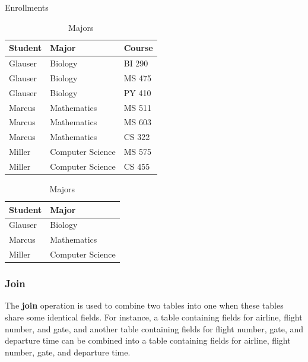 \documentclass[11pt]{article}
\begin{document}
\begin{table}[!htb]
    \begin{minipage}{.6\linewidth}
    \centering
    \caption{Enrollments}
    \begin{tabular}{|l|l|l|}
    \hline
        Student & Major & Course \\ \hline
        Glauser & Biology & BI 290 \\ \hline
        Glauser & Biology & MS 475 \\ \hline
        Glauser & Biology & PY 410 \\ \hline
        Marcus & Mathematics & MS 511 \\ \hline
        Marcus & Mathematics & MS 603 \\ \hline
        Marcus & Mathematics & CS 322 \\ \hline
        Miller & Computer Science & MS 575 \\ \hline
        Miller & Computer Science & CS 455 \\ \hline
    \end{tabular}
        
    \end{minipage}%
    \begin{minipage}{.4\linewidth}
        \caption{Majors}
        \begin{tabular}{|l|l|}
        \hline
            Student & Major \\ \hline
            Glauser & Biology \\ \hline
            Marcus & Mathematics \\ \hline
            Miller & Computer Science \\ \hline
        \end{tabular}
    \end{minipage} 
\end{table}

\subsubsection{Join}

The \textbf{join} operation is used to combine two tables into one when these tables share some identical fields. For instance, a table containing fields for airline, flight number, and gate, and another table containing fields for flight number, gate, and departure time can be combined into a table containing fields for airline, flight number, gate, and departure time.
\end{document}
